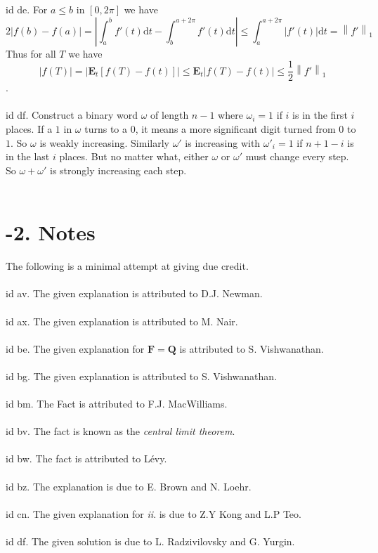 \documentclass[oneside]{book}
\newcommand{\F}{\mathbf{F}}
\newcommand{\E}{\mathbf{E}}
\newcommand{\Q}{\mathbf{Q}}
\newcommand{\abs}[1]{\left\lvert #1\right\rvert}
\newcommand{\norm}[1]{\left\lVert #1\right\rVert}
\renewcommand{\d}{\mathrm{d}}
\newcommand{\ii}{{\it ii}. }
\newcommand\chap[1]{%
  \chapter*{#1}%
  \addcontentsline{toc}{chapter}{#1}}
\begin{document}
id de. For $a\le b$ in $[0,2\pi]$ we have $$2\abs{f(b)-f(a)}=\abs{\int_a^b f'(t)\d t -\int_b^{a+2\pi}f'(t)\d t}\le\int_{a}^{a+2\pi}\abs{f'(t)}\d t = \norm{f'}_1$$
Thus for all $T$ we have $$\abs{f(T)} = \abs{\E_t [f(T)-f(t)]}\le \E_t\abs{f(T)-f(t)}\le \frac{1}{2}\norm{f'}_1 $$.\\\\


id df. Construct a binary word $\omega$ of length $n-1$ where $\omega_i=1$ if $i$ is in the first $i$ places. If a $1$ in $\omega$ turns to a $0$, it means a more significant digit turned from $0$ to $1$. So $\omega$ is weakly increasing. Similarly $\omega'$ is increasing with $\omega'_i=1$ if $n+1-i$ is in the last $i$ places. But no matter what, either $\omega$ or $\omega'$ must change every step. So $\omega+\omega'$ is strongly increasing each step. \\\\

\newpage
\chap{-2. Notes}
The following is a minimal attempt at giving due credit.    \\\\
id av. The given explanation is attributed to D.J. Newman.    \\\\


id ax. The given explanation is attributed to M. Nair.      \\\\


id be. The given explanation for $\F=\Q$ is attributed to S. Vishwanathan.  \\\\


id bg. The given explanation is attributed to S. Vishwanathan.  \\\\


id bm. The Fact is attributed to F.J. MacWilliams.  \\\\


id bv. The fact is known as the {\it central limit theorem}.    \\\\


id bw. The fact is attributed to Lévy.  \\\\


id bz. The explanation is due to E. Brown and N. Loehr.\\\\


id cn. The given explanation for \ii is due to Z.Y Kong and L.P Teo.\\\\


id df. The given solution is due to L. Radzivilovsky and G. Yurgin.\\\\
\end{document}

